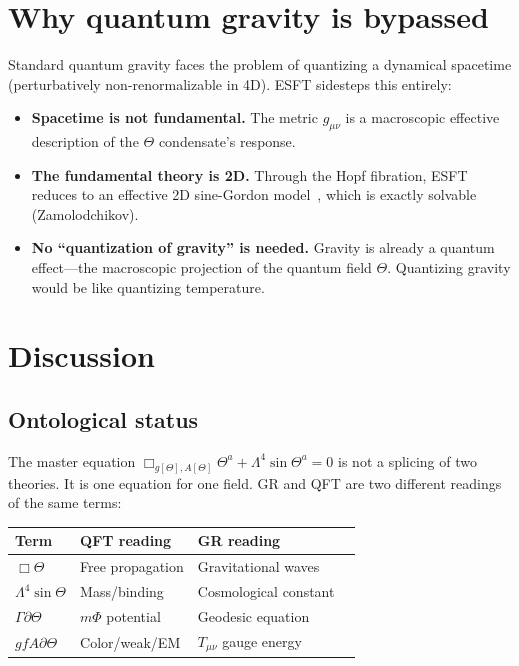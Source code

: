 \documentclass[twocolumn,preprintnumbers,amsmath,amssymb,prd]{revtex4-2}
\begin{document}
\section{Why quantum gravity is bypassed}
\label{sec:qg}

Standard quantum gravity faces the problem of quantizing a dynamical spacetime (perturbatively non-renormalizable in 4D).
ESFT sidesteps this entirely:
\begin{itemize}
\item \textbf{Spacetime is not fundamental.} The metric $g_{\mu\nu}$ is a macroscopic effective description of the $\Theta$ condensate's response.
\item \textbf{The fundamental theory is 2D.} Through the Hopf fibration, ESFT reduces to an effective 2D sine-Gordon model~\cite{Paper4}, which is exactly solvable (Zamolodchikov).
\item \textbf{No ``quantization of gravity'' is needed.} Gravity is already a quantum effect---the macroscopic projection of the quantum field $\Theta$. Quantizing gravity would be like quantizing temperature.
\end{itemize}

\section{Discussion}
\label{sec:discussion}

\subsection{Ontological status}

The master equation $\Box_{g[\Theta],A[\Theta]}\Theta^a + \Lambda^4\sin\Theta^a = 0$ is not a splicing of two theories.
It is one equation for one field.
GR and QFT are two different readings of the same terms:

\begin{center}
\begin{tabular}{llll}
\toprule
Term & QFT reading & GR reading \\
\midrule
$\Box\Theta$ & Free propagation & Gravitational waves \\
$\Lambda^4\sin\Theta$ & Mass/binding & Cosmological constant \\
$\Gamma\partial\Theta$ & $m\Phi$ potential & Geodesic equation \\
$gfA\partial\Theta$ & Color/weak/EM & $T_{\mu\nu}$ gauge energy \\
\bottomrule
\end{tabular}
\end{center}
\end{document}

